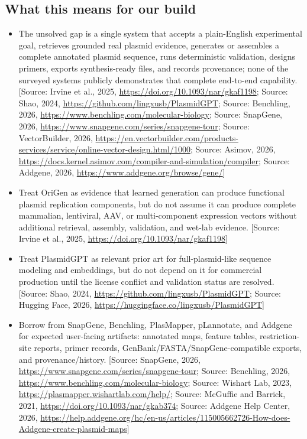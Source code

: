 \documentclass[11pt]{report}
\begin{document}
\subsection{What this means for our build}
\begin{itemize}
\item The unsolved gap is a single system that accepts a plain-English experimental goal, retrieves grounded real plasmid evidence, generates or assembles a complete annotated plasmid sequence, runs deterministic validation, designs primers, exports synthesis-ready files, and records provenance; none of the surveyed systems publicly demonstrates that complete end-to-end capability. [Source: Irvine et al., 2025, \url{https://doi.org/10.1093/nar/gkaf1198}; Source: Shao, 2024, \url{https://github.com/lingxusb/PlasmidGPT}; Source: Benchling, 2026, \url{https://www.benchling.com/molecular-biology}; Source: SnapGene, 2026, \url{https://www.snapgene.com/series/snapgene-tour}; Source: VectorBuilder, 2026, \url{https://en.vectorbuilder.com/products-services/service/online-vector-design.html/1000}; Source: Asimov, 2026, \url{https://docs.kernel.asimov.com/compiler-and-simulation/compiler}; Source: Addgene, 2026, \url{https://www.addgene.org/browse/gene/}]
\item Treat OriGen as evidence that learned generation can produce functional plasmid replication components, but do not assume it can produce complete mammalian, lentiviral, AAV, or multi-component expression vectors without additional retrieval, assembly, validation, and wet-lab evidence. [Source: Irvine et al., 2025, \url{https://doi.org/10.1093/nar/gkaf1198}]
\item Treat PlasmidGPT as relevant prior art for full-plasmid-like sequence modeling and embeddings, but do not depend on it for commercial production until the license conflict and validation status are resolved. [Source: Shao, 2024, \url{https://github.com/lingxusb/PlasmidGPT}; Source: Hugging Face, 2026, \url{https://huggingface.co/lingxusb/PlasmidGPT}]
\item Borrow from SnapGene, Benchling, PlasMapper, pLannotate, and Addgene for expected user-facing artifacts: annotated maps, feature tables, restriction-site reports, primer records, GenBank/FASTA/SnapGene-compatible exports, and provenance/history. [Source: SnapGene, 2026, \url{https://www.snapgene.com/series/snapgene-tour}; Source: Benchling, 2026, \url{https://www.benchling.com/molecular-biology}; Source: Wishart Lab, 2023, \url{https://plasmapper.wishartlab.com/help/}; Source: McGuffie and Barrick, 2021, \url{https://doi.org/10.1093/nar/gkab374}; Source: Addgene Help Center, 2026, \url{https://help.addgene.org/hc/en-us/articles/115005662726-How-does-Addgene-create-plasmid-maps}]

\end{itemize}
\end{document}
